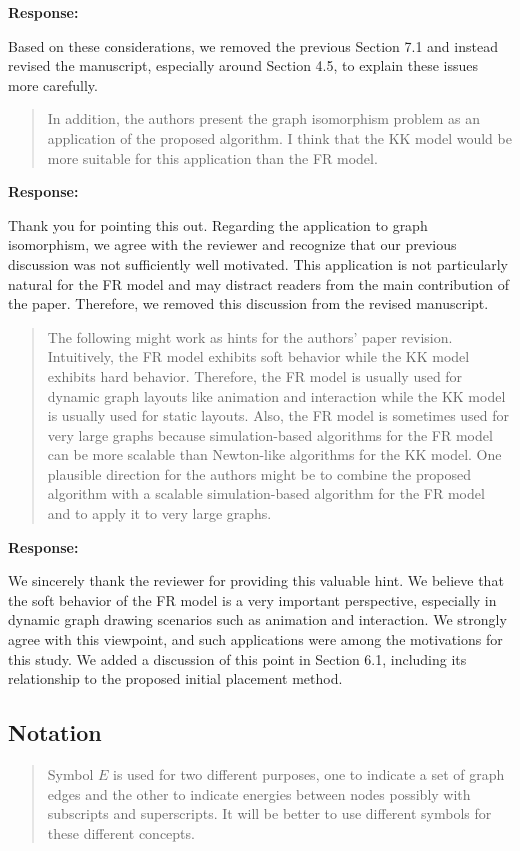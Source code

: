 \documentclass[11pt]{article}
\newcommand{\reviewercomment}[1]{%
  \begin{quote}
  \color{blue}
  #1
  \end{quote}
}
\newenvironment{response}{%
  \noindent\textbf{Response:}%
}{%
  \medskip
}
\begin{document}
\begin{response}
  Based on these considerations, we removed the previous Section 7.1 and instead revised the manuscript, especially around Section 4.5, to explain these issues more carefully.
\end{response}

\reviewercomment{
  In addition, the authors present the graph isomorphism problem as an application of the proposed algorithm.
  I think that the KK model would be more suitable for this application than the FR model.
}
\begin{response}
  Thank you for pointing this out. Regarding the application to graph isomorphism, we agree with the reviewer and recognize that our previous discussion was not sufficiently well motivated. This application is not particularly natural for the FR model and may distract readers from the main contribution of the paper. Therefore, we removed this discussion from the revised manuscript.
\end{response}

\reviewercomment{
  The following might work as hints for the authors' paper revision.
  Intuitively, the FR model exhibits soft behavior while the KK model exhibits hard behavior.
  Therefore, the FR model is usually used for dynamic graph layouts like animation and interaction while the KK model is usually used for static layouts.
  Also, the FR model is sometimes used for very large graphs because simulation-based algorithms for the FR model can be more scalable than Newton-like algorithms for the KK model.
  One plausible direction for the authors might be to combine the proposed algorithm with a scalable simulation-based algorithm for the FR model and to apply it to very large graphs.
}
\begin{response}
  We sincerely thank the reviewer for providing this valuable hint. We believe that the soft behavior of the FR model is a very important perspective, especially in dynamic graph drawing scenarios such as animation and interaction.
  We strongly agree with this viewpoint, and such applications were among the motivations for this study.
  We added a discussion of this point in Section 6.1, including its relationship to the proposed initial placement method.
\end{response}

\subsection{Notation}

\reviewercomment{
  Symbol $E$ is used for two different purposes, one to indicate a set of graph edges and the other to indicate energies between nodes possibly with subscripts and superscripts.
  It will be better to use different symbols for these different concepts.
}
\end{document}
